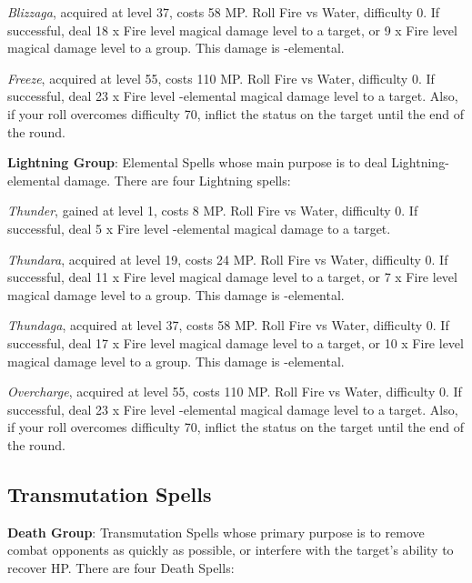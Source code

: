 \begin{multicols}{2}
    \textit{Blizzaga}, acquired at level 37, costs 58 MP\@. Roll Fire vs Water, difficulty 0. If successful, deal 18 x Fire level magical damage level to a target, or 9 x Fire level magical damage level to a group. This damage is -elemental.
    
    \textit{Freeze}, acquired at level 55, costs 110 MP\@. Roll Fire vs Water, difficulty 0. If successful, deal 23 x Fire level -elemental magical damage level to a target. Also, if your roll overcomes difficulty 70, inflict the  status on the target until the end of the round.

    \ffcrystal[type=level,height=8pt]

    \textbf{Lightning Group}: Elemental Spells whose main purpose is to deal Lightning-elemental damage. There are four Lightning spells:
    
    \textit{Thunder}, gained at level 1, costs 8 MP\@. Roll Fire vs Water, difficulty 0. If successful, deal 5 x Fire level -elemental magical damage to a target.
    
    \textit{Thundara}, acquired at level 19, costs 24 MP\@. Roll Fire vs Water, difficulty 0. If successful, deal 11 x Fire level magical damage level to a target, or 7 x Fire level magical damage level to a group. This damage is -elemental.
    
    \textit{Thundaga}, acquired at level 37, costs 58 MP\@. Roll Fire vs Water, difficulty 0. If successful, deal 17 x Fire level magical damage level to a target, or 10 x Fire level magical damage level to a group. This damage is -elemental.
    
    \textit{Overcharge}, acquired at level 55, costs 110 MP\@. Roll Fire vs Water, difficulty 0. If successful, deal 23 x Fire level -elemental magical damage level to a target. Also, if your roll overcomes difficulty 70, inflict the  status on the target until the end of the round.

    \subsection{Transmutation Spells}\label{subsec:black-transmutation}

    \textbf{Death Group}: Transmutation Spells whose primary purpose is to remove combat opponents as quickly as possible, or interfere with the target's ability to recover HP\@. There are four Death Spells:
    

\end{multicols}
